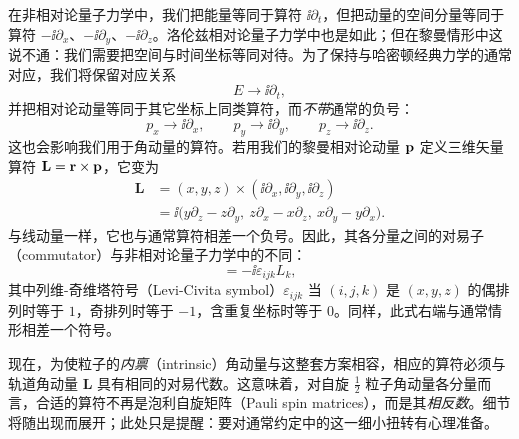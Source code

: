 在非相对论量子力学中，我们把能量等同于算符 $\ii\partial_{t}$，但把动量的空间分量等同于算符 $-\ii\partial_{x}$、$-\ii\partial_{y}$、$-\ii\partial_{z}$。洛伦兹相对论量子力学中也是如此；但在黎曼情形中这说不通：我们需要把空间与时间坐标等同对待。为了保持与哈密顿经典力学的通常对应，我们将保留对应关系
\begin{equation}
E\to \ii\partial_{t},
\end{equation}
并把相对论动量等同于其它坐标上同类算符，而\emph{不带}通常的负号：
\begin{equation}
p_{x}\to \ii\partial_{x},\qquad p_{y}\to \ii\partial_{y},\qquad p_{z}\to \ii\partial_{z}.
\end{equation}
这也会影响我们用于角动量的算符。若用我们的黎曼相对论动量 $\mathbf{p}$ 定义三维矢量算符 $\mathbf{L}=\mathbf{r}\times\mathbf{p}$，它变为
\begin{align}
\mathbf{L}&=(x,y,z)\times(\ii\partial_{x},\ii\partial_{y},\ii\partial_{z})\nonumber\\
&=\ii\bigl(y\partial_{z}-z\partial_{y},\ z\partial_{x}-x\partial_{z},\ x\partial_{y}-y\partial_{x}\bigr).
\end{align}
与线动量一样，它也与通常算符相差一个负号。因此，其各分量之间的对易子（commutator）与非相对论量子力学中的不同：
\begin{equation}
[L_{i},L_{j}]=-\ii\varepsilon_{ijk}L_{k},
\end{equation}
其中列维-奇维塔符号（Levi-Civita symbol）$\varepsilon_{ijk}$ 当 $(i,j,k)$ 是 $(x,y,z)$ 的偶排列时等于 $1$，奇排列时等于 $-1$，含重复坐标时等于 $0$。同样，此式右端与通常情形相差一个符号。

现在，为使粒子的\emph{内禀}（intrinsic）角动量与这整套方案相容，相应的算符必须与轨道角动量 $\mathbf{L}$ 具有相同的对易代数。这意味着，对自旋 $\tfrac{1}{2}$ 粒子角动量各分量而言，合适的算符不再是泡利自旋矩阵（Pauli spin matrices），而是其\emph{相反数}。细节将随出现而展开；此处只是提醒：要对通常约定中的这一细小扭转有心理准备。
